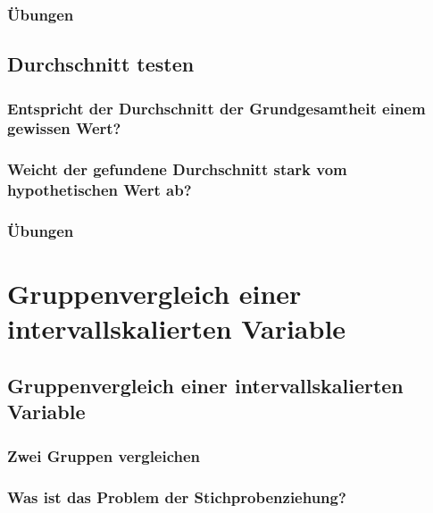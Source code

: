 \documentclass[
]{book}
\begin{document}
\section{Übungen}\label{uxfcbungen-2}

\chapter{Durchschnitt testen}\label{durchschnitt-testen}

\section{Entspricht der Durchschnitt der Grundgesamtheit einem gewissen Wert?}\label{entspricht-der-durchschnitt-der-grundgesamtheit-einem-gewissen-wert}

\section{Weicht der gefundene Durchschnitt stark vom hypothetischen Wert ab?}\label{weicht-der-gefundene-durchschnitt-stark-vom-hypothetischen-wert-ab}

\section{Übungen}\label{uxfcbungen-3}

\part{Gruppenvergleich einer intervallskalierten Variable}\label{part-gruppenvergleich-einer-intervallskalierten-variable}

\chapter{Gruppenvergleich einer intervallskalierten Variable}\label{gruppenvergleich-einer-intervallskalierten-variable}

\section{Zwei Gruppen vergleichen}\label{zwei-gruppen-vergleichen}

\section{Was ist das Problem der Stichprobenziehung?}\label{was-ist-das-problem-der-stichprobenziehung-1}
\end{document}

